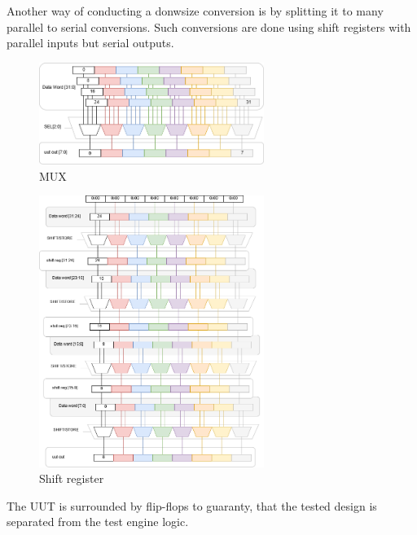 Another way of conducting a donwsize conversion is by splitting it to many parallel to serial conversions. Such conversions are done using shift registers with parallel inputs but serial outputs.

\begin{figure}[h]
\centering
\includegraphics[width=0.65\textwidth]{figures/MUX.png}
\caption{MUX}
\label{fig:mux}
\end{figure}

\begin{figure}[h]
\centering
\includegraphics[width=0.65\textwidth]{figures/Shift_2.png}
\caption{Shift register}
\label{fig:shift}
\end{figure}
The UUT is surrounded by flip-flops to guaranty, that the tested design is separated from the test engine logic.
